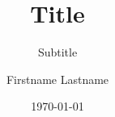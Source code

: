 \documentclass[parskip=half]{scrbook}
\title{Title}
\subtitle{Subtitle}
\author{Firstname Lastname}
\date{\today}
\providecommand{\listoflistings}{\lstlistoflistings}
\begin{document}
\frontmatter
\maketitle

\tableofcontents
\listoffigures
\listoftables
\listofalgorithms
\listoflistings


\mainmatter



\backmatter
\appendix

\printglossaries

\end{document}
